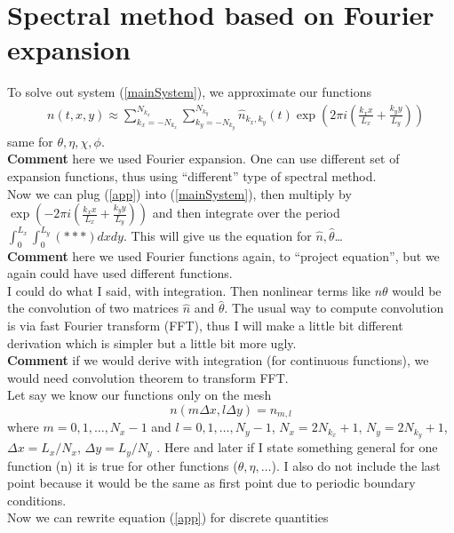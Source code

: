 \documentclass[preprint,aip,pop]{article}
\begin{document}
\section{Spectral method based on Fourier expansion}
To solve out system (\ref{mainSystem}), we approximate our functions
\begin{align}
  & n(t,x,y) \approx \sum_{k_x = -N_{k_x}}^{N_{k_x}} \sum_{k_y = -N_{k_y}}^{N_{k_y}}   \hat{n}_{k_x,k_y}(t) \exp \left ( 2\pi i \left ( \frac{k_x x}{L_x} + \frac{k_y y} {L_y} \right ) \right ) \label{app}
\end{align}
same for $\theta,\eta,\chi,\phi$.
\\ [2mm]
\textbf{Comment} here we used Fourier expansion. One can use
different set of expansion functions, thus using ``different'' type of spectral
method.
\\ [2mm]
Now we can plug (\ref{app}) into (\ref{mainSystem}), then multiply by $\exp
\left (- 2\pi i \left ( \frac{k_x x}{L_x} + \frac{k_y y} {L_y} \right ) \right
)$ and then integrate over the period $\int_0^{L_x} \int_0^{L_y} (***) dxdy$.
This will give us the equation for $\hat{n},\hat{\theta}$\dots
\\ [2mm]
\textbf{Comment} here we used Fourier functions again, to ``project equation'',
but we again could have used different functions.
\\ [2mm]
I could do what I said, with integration. Then nonlinear terms like $n\theta$
would be the convolution of two matrices $\hat{n}$ and $\hat{\theta}$.
The usual way to compute convolution is via fast Fourier transform (FFT), thus I
will make a little bit different derivation which is simpler but a little bit
more ugly. 
\\ [2mm]
\textbf{Comment} if we would derive with integration (for continuous functions),
we would need convolution theorem to transform FFT.
\\ [2mm]
Let say we know our functions only on the mesh
\begin{equation}
  n( m \Delta x, l \Delta y ) = n_{m,l}
\end{equation}
where $m = 0,1,\dots,N_x -1 $ and $l = 0,1,\dots,N_y -1$,
$N_x = 2N_{k_x} + 1$,
$N_y = 2N_{k_y} + 1$,
$\Delta x = L_x/N_x$,
$\Delta y = L_y/N_y$
. Here and later if I state something general for one
function (n) it is true for other functions ($\theta,\eta,\dots$).
I also do not include the last point because it would be the same as first point
due to periodic boundary conditions.
\\
Now we can rewrite equation (\ref{app}) for discrete quantities
\end{document}
